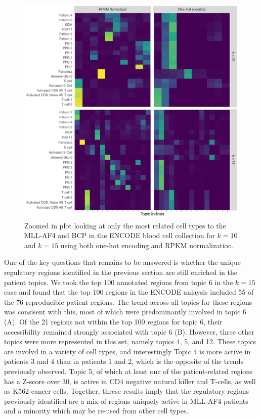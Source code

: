 \begin{figure}[htbp]
    \centering
    \includegraphics[width=\textwidth]{plot/ch5/encode_zoom.pdf} 
    \caption{Zoomed in plot looking at only the most related cell types to the MLL-AF4 and BCP in the ENCODE blood cell collection for $k=10$ and $k=15$ using both one-hot encoding and RPKM normalization.}
    \label{fig:encode_zoom}
\end{figure}

One of the key questions that remains to be answered is whether the unique regulatory regions identified in the previous section are still enriched in the patient topics. We took the top 100 annotated regions from topic 6 in the $k=15$ case and found that the top 100 regions in the ENCODE anlaysis included 55 of the 76 reproducible patient regions. The trend across all topics for these regions was consisent with this, most of which were predominantly involved in topic 6 (A). Of the 21 regions not within the top 100 regions for topic 6, their accessibility remained strongly associated with topic 6 (B). However, three other topics were more represented in this set, namely topics 4, 5, and 12. These topics are involvd in a variety of cell types, and interestingly Topic 4 is more active in patients 3 and 4 than in patients 1 and 2, which is the opposite of the trends previously observed. Topic 5, of which at least one of the patient-related regions has a Z-score over 30, is active in CD4 negative natural killer and T-cells, as well as K562 cancer cells. Together, threse results imply that the regulatory regions previously identified are a mix of regions uniquely active in MLL-AF4 patients and a minority which may be re-used from other cell types.  

